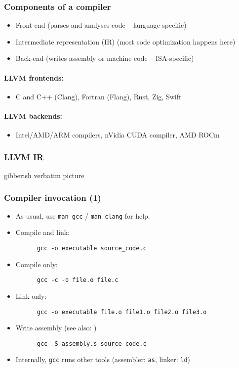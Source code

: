 \documentclass[12pt]{article}
\begin{document}
\subsubsection{Components of a compiler}
\begin{itemize}
    \item Front-end (parses and analyses code -- language-specific)
    \item Intermediate representation (IR) (most code optimization happens here)
    \item Back-end (writes assembly or machine code -- ISA-specific)
\end{itemize}

\paragraph{LLVM frontends:}
\begin{itemize}
    \item C and C++ (Clang), Fortran (Flang), Rust, Zig, Swift
\end{itemize}

\paragraph{LLVM backends:}
\begin{itemize}
    \item Intel/AMD/ARM compilers, nVidia CUDA compiler, AMD ROCm
\end{itemize}

\subsubsection{LLVM IR}
 gibberish verbatim picture

\subsubsection{Compiler invocation (1)}

\begin{itemize}
  \item As usual, use \texttt{man gcc} / \texttt{man clang} for help.
  \item Compile and link:
    \begin{verbatim}
      gcc -o executable source_code.c
    \end{verbatim}
  \item Compile only:
    \begin{verbatim}
      gcc -c -o file.o file.c
    \end{verbatim}
  \item Link only:
    \begin{verbatim}
      gcc -o executable file.o file1.o file2.o file3.o
    \end{verbatim}
  \item Write assembly (see also: )
    \begin{verbatim}
      gcc -S assembly.s source_code.c
    \end{verbatim}
  \item Internally, \texttt{gcc} runs other tools (assembler: \texttt{as}, linker: \texttt{ld})
\end{itemize}
\end{document}
